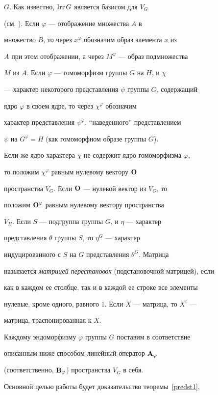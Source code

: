 $G$. Как известно, $\operatorname{Irr} G$ является базисом для $V_{G}$


(см. \cite{BelFomin}). Если $\varphi$ --- отображение множества $A$ в


множество $B$, то через $x^{\varphi}$ обозначим образ элемента $x$ из


$A$ при этом отображении, а через $M^{\varphi}$ --- образ подмножества


$M$ из $A$. Если $\varphi$ --- гомоморфизм группы $G$ на $H$, и $\chi$


--- характер некоторого представления $\psi$ группы $G$, содержащий


ядро $\varphi$ в своем ядре, то через $\chi^{\varphi}$ обозначим


характер представления $\psi^{\varphi}$, ``наведенного'' представлением


$\psi$ на $G^{\varphi}=H$ (как гомоморфном образе группы $G$).


Если же ядро характера $\chi$ не содержит ядро гомоморфизма $\varphi$,


то положим $\chi^{\varphi}$ равным нулевому вектору $\bold O$


пространства $V_{G}$. Если $\bold O$ --- нулевой вектор из $V_{G}$, то


положим $\bold O^{\varphi}$ равным нулевому вектору пространства


$V_{H}$. Если $S$ --- подгруппа группы $G$, и $\eta$ --- характер


представления $\theta$ группы $S$, то $\eta^{G}$ --- характер


индуцированного с $S$ на $G$ представления $\theta^{G}$. Матрица


называется {\it матрицей перестановок} (подстановочной матрицей), если


как в каждом ее столбце, так и в каждой ее строке все элементы


нулевые, кроме одного, равного 1. Если $X$ --- матрица, то $X^{t}$ ---


матрица, траспонированная к $X$.





Каждому эндоморфизму $\varphi $ группы $G$ поставим в соответствие


описанным ниже способом линейный оператор $\bold A_{\varphi}$


(соответственно, $\bold B_{\varphi}$) пространства $V_{G}$ в себя.


Основной целью работы будет доказательство теоремы~\ref{predst1},


